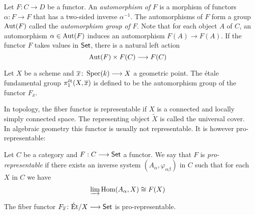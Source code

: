 \begin{definition}
	Let $F: C \to D$ be a functor. An \textit{automorphism of $F$} is a morphism of functors $\alpha \colon F \to F$ that has a two-sided inverse $\alpha^{-1}$. The automorphisms of $F$ form a group $\operatorname{Aut}(F)$ called the \textit{automorphism group of $F$}. Note that for each object $A$ of $C$, an automorphism $\alpha \in \operatorname{Aut}(F)$ induces an automorphism $F(A) \to F(A)$. If the functor $F$ takes values in $\mathsf{Set}$, there is a natural left action
	\[
		\operatorname{Aut}(F) \times F(C) \longrightarrow F(C)
	\]
\end{definition}

\begin{definition}
	Let $X$ be a scheme and $\overline{x} \colon \operatorname{Spec}(k) \longrightarrow X$ a geometric point. The \'etale fundamental group $\pi^{\text{\'et}}_1(X,\overline{x})$ is defined to be the automorphism group of the functor $F_{\overline{x}}$.
\end{definition}



\begin{remark}
	In topology, the fiber functor is representable if $X$ is a connected and locally simply connected space. The representing object $\tilde{X}$ is called the universal cover. In algebraic geometry this functor is usually not representable. It is however pro-representable:
\end{remark}

\begin{definition}
	Let $C$ be a category and $F: C \longrightarrow \mathsf{Set}$ a functor. We say that $F$ is \textit{pro-representable} if there exists an inverse system $(A_\alpha,\varphi_{\alpha \beta})$ in $C$ such that for each $X$ in $C$ we have
	\[
		\varinjlim \operatorname{Hom}(A_\alpha, X) \cong F(X)
	\]
\end{definition}

\begin{theorem}\label{thm:pro_rep}
	The fiber functor $F_{\overline{x}} \colon \text{\'Et}/X \longrightarrow \mathsf{Set}$ is pro-representable.
\end{theorem}

